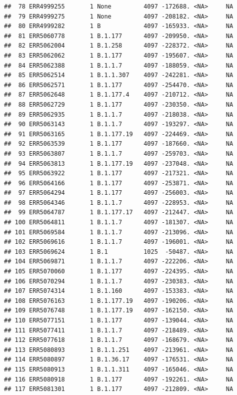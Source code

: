 \documentclass[
]{article}
\begin{document}
\begin{verbatim}
##  78 ERR4999255       1 None         4097 -172688. <NA>     NA
##  79 ERR4999275       1 None         4097 -208182. <NA>     NA
##  80 ERR4999282       1 B            4097 -165933. <NA>     NA
##  81 ERR5060778       1 B.1.177      4097 -209950. <NA>     NA
##  82 ERR5062004       1 B.1.258      4097 -228372. <NA>     NA
##  83 ERR5062062       1 B.1.177      4097 -195607. <NA>     NA
##  84 ERR5062388       1 B.1.1.7      4097 -188059. <NA>     NA
##  85 ERR5062514       1 B.1.1.307    4097 -242281. <NA>     NA
##  86 ERR5062571       1 B.1.177      4097 -254470. <NA>     NA
##  87 ERR5062648       1 B.1.177.4    4097 -210712. <NA>     NA
##  88 ERR5062729       1 B.1.177      4097 -230350. <NA>     NA
##  89 ERR5062935       1 B.1.1.7      4097 -218038. <NA>     NA
##  90 ERR5063143       1 B.1.1.7      4097 -193297. <NA>     NA
##  91 ERR5063165       1 B.1.177.19   4097 -224469. <NA>     NA
##  92 ERR5063539       1 B.1.177      4097 -187660. <NA>     NA
##  93 ERR5063807       1 B.1.1.7      4097 -259703. <NA>     NA
##  94 ERR5063813       1 B.1.177.19   4097 -237048. <NA>     NA
##  95 ERR5063922       1 B.1.177      4097 -217321. <NA>     NA
##  96 ERR5064166       1 B.1.177      4097 -253871. <NA>     NA
##  97 ERR5064294       1 B.1.177      4097 -256003. <NA>     NA
##  98 ERR5064346       1 B.1.1.7      4097 -228953. <NA>     NA
##  99 ERR5064787       1 B.1.177.17   4097 -212447. <NA>     NA
## 100 ERR5064811       1 B.1.1.7      4097 -181307. <NA>     NA
## 101 ERR5069584       1 B.1.1.7      4097 -213096. <NA>     NA
## 102 ERR5069616       1 B.1.1.7      4097 -196001. <NA>     NA
## 103 ERR5069624       1 B.1          1025  -50487. <NA>     NA
## 104 ERR5069871       1 B.1.1.7      4097 -222206. <NA>     NA
## 105 ERR5070060       1 B.1.177      4097 -224395. <NA>     NA
## 106 ERR5070294       1 B.1.1.7      4097 -230383. <NA>     NA
## 107 ERR5074314       1 B.1.160      4097 -153383. <NA>     NA
## 108 ERR5076163       1 B.1.177.19   4097 -190206. <NA>     NA
## 109 ERR5076748       1 B.1.177.19   4097 -162150. <NA>     NA
## 110 ERR5077151       1 B.1.177      4097 -139044. <NA>     NA
## 111 ERR5077411       1 B.1.1.7      4097 -218489. <NA>     NA
## 112 ERR5077618       1 B.1.1.7      4097 -168679. <NA>     NA
## 113 ERR5080893       1 B.1.1.251    4097 -213961. <NA>     NA
## 114 ERR5080897       1 B.1.36.17    4097 -176531. <NA>     NA
## 115 ERR5080913       1 B.1.1.311    4097 -165046. <NA>     NA
## 116 ERR5080918       1 B.1.177      4097 -192261. <NA>     NA
## 117 ERR5081301       1 B.1.177      4097 -212809. <NA>     NA

\end{verbatim}
\end{document}
